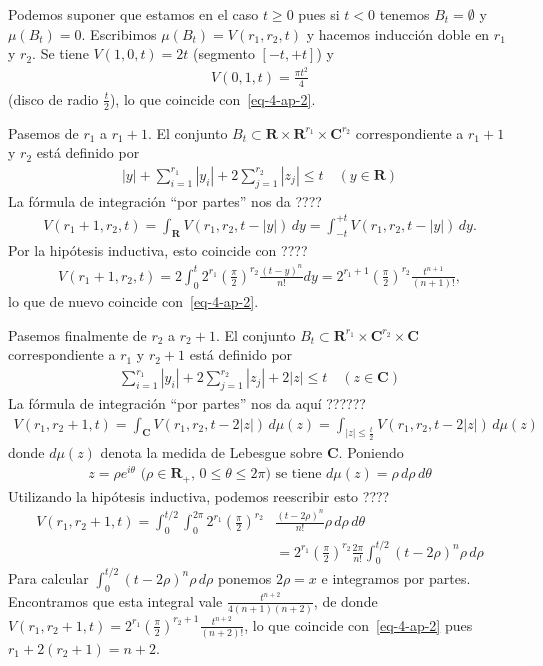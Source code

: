 \documentclass[bibtotoc,leqno,spanish]{amsbook}
\newcommand{\RR}{\mathbf{R}}
\newcommand{\CC}{\mathbf{C}}
\newcommand{\abs}[1]{\left\lvert#1\right\rvert}
\numberwithin{equation}{section}
\theoremstyle{note}
\theoremstyle{note}
\theoremstyle{rem}
\numberwithin{theorem}{section}
\numberwithin{proposition}{section}
\numberwithin{definition}{section}
\numberwithin{lemma}{section}
\numberwithin{corollary}{section}
\numberwithin{example}{section}
\numberwithin{footnote}{section}%
\begin{document}
Podemos suponer que estamos en el caso $t\geq 0$ pues si $t < 0$ tenemos $B_{t}=\emptyset$ y $\mu(B_{t})=0$.
Escribimos $\mu(B_{t}) = V(r_{1},r_{2},t)$ y hacemos inducci\'on doble en $r_{1}$ y $r_{2}$. Se tiene
$V(1,0,t) = 2t$ (segmento $[-t,+t]$) y
\begin{gather*}
V(0,1,t)=\frac{\pi t^{2}}{4}
\end{gather*}
(disco de radio $\frac{t}{2}$), lo que coincide con~\eqref{eq-4-ap-2}.

Pasemos de $r_{1}$ a $r_{1}+1$. El conjunto $B_{t}\subset\RR\times\RR^{r_{1}}\times\CC^{r_{2}}$ correspondiente
a $r_{1}+1$ y $r_{2}$ est\'a definido por
\begin{gather*}
\abs{y}+\sum_{i=1}^{r_{1}}\abs{y_{i}}+2\sum_{j=1}^{r_{2}}\abs{z_{j}}\leq t\quad(y\in\RR)
\end{gather*}
La f\'ormula de integraci\'on ``por partes'' nos da ????
\begin{gather*}
V(r_{1}+1,r_{2},t) = \int_{\RR}V(r_{1},r_{2},t-\abs{y})\,dy=\int_{-t}^{+t}V(r_{1},r_{2},t-\abs{y})\,dy.
\end{gather*}
Por la hip\'otesis inductiva, esto coincide con ????
\begin{gather*}
V(r_{1}+1,r_{2},t) = 2\int_{0}^{t}2^{r_{1}}\left(\frac{\pi}{2}\right)^{r_{2}}\frac{(t-y)^{n}}{n!}dy
=2^{r_{1}+1}\left(\frac{\pi}{2}\right)^{r_{2}}\frac{t^{n+1}}{(n+1)!},
\end{gather*}
lo que de nuevo coincide con~\eqref{eq-4-ap-2}.

Pasemos finalmente de $r_{2}$ a $r_{2}+1$. El conjunto $B_{t}\subset\RR^{r_{1}}\times\CC^{r_{2}}\times\CC$
correspondiente a $r_{1}$ y $r_{2}+1$ est\'a definido por
\begin{gather*}
\sum_{i=1}^{r_{1}}\abs{y_{i}}+2\sum_{j=1}^{r_{2}}\abs{z_{j}}+2\abs{z}\leq t\quad(z\in\CC)
\end{gather*}
La f\'ormula de integraci\'on ``por partes'' nos da aqu\'i ??????
\begin{gather*}
V(r_{1},r_{2}+1,t)=\int_{\CC}V(r_{1},r_{2},t-2\abs{z})\,d\mu(z)=\int_{\abs{z}\leq\frac{t}{2}}V(r_{1},r_{2},t-2\abs{z})\,d\mu(z)
\end{gather*}
donde $d\mu(z)$ denota la medida de Lebesgue sobre $\CC$. Poniendo
\begin{gather*}
\text{$z = \rho e^{i\theta}$ ($\rho\in\RR_{+}$, $0\leq\theta\leq 2\pi$) se tiene $d\mu(z) = \rho\,d\rho\,d\theta$}
\end{gather*}
Utilizando la hip\'otesis inductiva, podemos reescribir esto ????
\begin{align*}
V(r_{1},r_{2}+1,t) = \int_{0}^{t/2}\int_{0}^{2\pi}2^{r_{1}}\left(\frac{\pi}{2}\right)^{r_{2}}
&\frac{(t-2\rho)^{n}}{n!}\rho\,d\rho\,d\theta\\
&=2^{r_{1}}\left(\frac{\pi}{2}\right)^{r_{2}}\frac{2\pi}{n!}\int_{0}^{t/2}(t-2\rho)^{n}\rho\,d\rho
\end{align*}
Para calcular $\int_{0}^{t/2}(t-2\rho)^{n}\rho\,d\rho$ ponemos $2\rho = x$ e integramos por partes.
Encontramos que esta integral vale $\frac{t^{n+2}}{4(n+1)(n+2)}$, de donde
$V(r_{1},r_{2}+1,t) = 2^{r_{1}}\left(\frac{\pi}{2}\right)^{r_{2}+1}\frac{t^{n+2}}{(n+2)!}$, lo que coincide
con~\eqref{eq-4-ap-2} pues $r_{1}+2(r_{2}+1)=n+2$.
\end{document}
